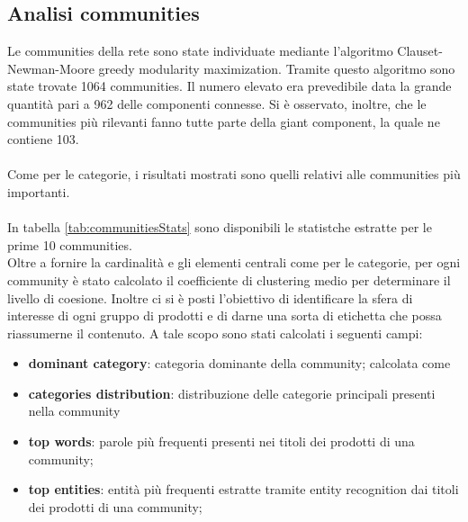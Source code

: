 \subsection{Analisi communities}
Le communities della rete sono state individuate mediante l'algoritmo Clauset-Newman-Moore greedy modularity maximization. Tramite questo algoritmo sono state trovate 1064 communities. Il numero elevato era prevedibile data la grande quantità pari a 962 delle componenti connesse. Si è osservato, inoltre, che le communities più rilevanti fanno tutte parte della giant component, la quale ne contiene 103. \\\\
Come per le categorie, i risultati mostrati sono quelli relativi alle communities più importanti. 
\\\\
In tabella \ref{tab:communitiesStats} sono disponibili le statistche estratte per le prime 10 communities. \\
Oltre a fornire la cardinalità e gli elementi centrali come per le categorie, per ogni community è stato calcolato il coefficiente di clustering medio per determinare il livello di coesione.  Inoltre ci si è posti l'obiettivo di identificare la sfera di interesse di ogni gruppo di prodotti e di darne una sorta di etichetta che possa riassumerne il contenuto. A tale scopo sono stati calcolati i seguenti campi:
\begin{itemize}
    \item \textbf{dominant category}: categoria dominante della community; calcolata come %
    \item \textbf{categories distribution}: distribuzione delle categorie principali presenti nella community
    \item \textbf{top words}: parole più frequenti presenti nei titoli dei prodotti di una community; %
    \item \textbf{top entities}: entità più frequenti estratte tramite entity recognition dai titoli dei prodotti di una community; %
\end{itemize}

